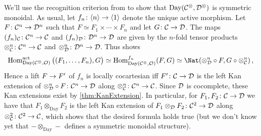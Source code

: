\begin{proof*}
	We'll use the recognition criterion from  to show that $\operatorname{Day}(\mathcal{C}^\otimes,\mathcal{D}^\otimes)$ is symmetric monoidal. As usual, let $f_n\colon \langle n\rangle \morphism\langle 1\rangle$ denote the unique active morphism. Let $F\colon \Cc^n\morphism\Dd^n$ such that $F\simeq F_1\times\dotsb\times F_n$ and let $G\colon \Cc\morphism \Dd$. The maps $(f_n)_\Cc\colon \Cc^n\morphism \Cc$ and $(f_n)_\Dd\colon \Dd^n\morphism \Dd$ are given by the $n$-fold tensor products $\otimes_\Cc^n\colon \Cc^n\morphism\Cc$ and $\otimes_\Dd^n\colon \Dd^n\morphism\Dd$. Thus \itememph{\boxtimes} shows
	\begin{equation*}
		\Hom_{\operatorname{Day}(\Cc^\otimes,\Oo)}^\mathrm{act}\big((F_1,\dotsc,F_n),G\big)\simeq \Hom_{\operatorname{Day}(\Cc^\otimes,\Oo)}^{f_n}(F,G)\simeq \Nat(\otimes_\Dd^n\circ F,G\circ \otimes_\Cc^n)\,,
	\end{equation*}
	Hence a lift $F\morphism F'$ of $f_n$ is locally cocartesian iff $F'\colon \Cc\morphism\Dd$ is the left Kan extension of $\otimes_\Dd^n\circ F\colon \Cc^n\morphism\Dd$ along $\otimes_\Cc^n\colon \Cc^n\morphism\Cc$. Since $\mathcal{D}$ is cocomplete, these Kan extensions exist by \cref{thm:KanExtension}. In particular, for $F_1,F_2\colon \Cc\morphism\Dd$ we have that $F_1\otimes_{\operatorname{Day}}F_2$ is the left Kan extension of $F_1\otimes_\Dd F_2\colon \Cc^2\morphism \Dd$ along $\otimes_\Cc^2\colon \Cc^2\morphism\Cc$, which shows that the desired formula holds true (but we don't know yet that $-\otimes_{\operatorname{Day}}-$ defines a symmetric monoidal structure).
	

\end{proof*}

